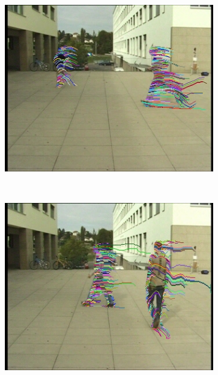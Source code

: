 \begin{figure}[t]
\begin{subfigure}[b]{0.24\textwidth}
                \includegraphics[width=\textwidth, trim=6 0 5 1, clip]{fig6.jpg}
                \label{fig:cp02_videoCapture2}
        \end{subfigure}%
        ~ %
        \begin{subfigure}[b]{0.24\textwidth}
                \centering
                \caption{~}
                \includegraphics[width=\textwidth, trim=6 0 5 1, clip]{fig7.jpg}
                \label{fig:cp02_videoCapture3}
        \end{subfigure}%

\end{figure}
